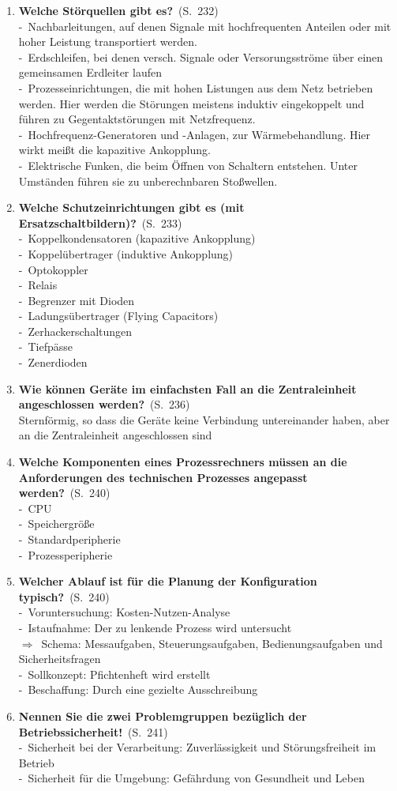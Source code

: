 \documentclass[a4paper,12pt]{article}
\newcommand{\question}[3]{\pagebreak[3]\item {\textbf{#1?}}\ (S.\ #2)#3}
\newcommand{\statement}[3]{\pagebreak[3]\item {\textbf{#1!}}\ (S.\ #2)#3}
\newcommand{\catchword}[1]{\\-\ #1}
\newcommand{\normaltext}[1]{\\#1}
\newcommand{\result}[1]{\\$\Rightarrow$\ #1}
\newcommand{\page}[1]{#1}
\begin{document}
\begin{enumerate}
  \question{Welche Störquellen gibt es}{\page{232}}
  {
    \catchword{Nachbarleitungen, auf denen Signale mit hochfrequenten Anteilen oder mit hoher
               Leistung transportiert werden.}
    \catchword{Erdschleifen, bei denen versch. Signale oder Versorungsströme über einen gemeinsamen
               Erdleiter laufen}
    \catchword{Prozesseinrichtungen, die mit hohen Listungen aus dem Netz betrieben werden. Hier
               werden die Störungen meistens induktiv eingekoppelt und führen zu Gegentaktstörungen mit
               Netzfrequenz.}
    \catchword{Hochfrequenz-Generatoren und -Anlagen, zur Wärmebehandlung. Hier wirkt meißt die
               kapazitive Ankopplung.}
    \catchword{Elektrische Funken, die beim Öffnen von Schaltern entstehen. Unter Umständen führen
               sie zu unberechnbaren Stoßwellen.}
  }

  \question{Welche Schutzeinrichtungen gibt es (mit Ersatzschaltbildern)}{\page{233}}
  {
    \catchword{Koppelkondensatoren (kapazitive Ankopplung)}
    \catchword{Koppelübertrager (induktive Ankopplung)}
    \catchword{Optokoppler}
    \catchword{Relais}
    \catchword{Begrenzer mit Dioden}
    \catchword{Ladungsübertrager (Flying Capacitors)}
    \catchword{Zerhackerschaltungen}
    \catchword{Tiefpässe}
    \catchword{Zenerdioden}
  }

  \question{Wie können Geräte im einfachsten Fall an die Zentraleinheit angeschlossen
            werden}{\page{236}}
  {
    \normaltext{Sternförmig, so dass die Geräte keine Verbindung untereinander haben, aber
                an die Zentraleinheit angeschlossen sind}
  }

  \question{Welche Komponenten eines Prozessrechners müssen an die Anforderungen
            des technischen Prozesses angepasst werden}{\page{240}}
  {
    \catchword{CPU}
    \catchword{Speichergröße}
    \catchword{Standardperipherie}
    \catchword{Prozessperipherie}
  }

  \question{Welcher Ablauf ist für die Planung der Konfiguration typisch}{\page{240}}
  {
    \catchword{Voruntersuchung: Kosten-Nutzen-Analyse}
    \catchword{Istaufnahme: Der zu lenkende Prozess wird untersucht}
    \result{Schema: Messaufgaben, Steuerungsaufgaben, Bedienungsaufgaben und Sicherheitsfragen}
    \catchword{Sollkonzept: Pfichtenheft wird erstellt}
    \catchword{Beschaffung: Durch eine gezielte Ausschreibung}
  }

  \statement{Nennen Sie die zwei Problemgruppen bezüglich der Betriebssicherheit}{\page{241}}
  {
    \catchword{Sicherheit bei der Verarbeitung: Zuverlässigkeit und Störungsfreiheit im Betrieb}
    \catchword{Sicherheit für die Umgebung: Gefährdung von Gesundheit und Leben}
  }


\end{enumerate}
\end{document}
